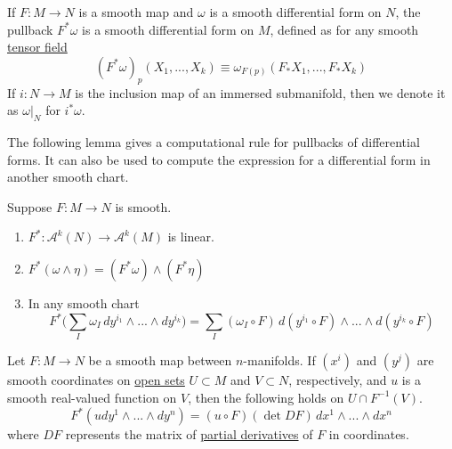\documentclass{article}
\newcounter{theorem}[section]
\begin{document}
    If $F: M \to N$ is a smooth map and $\omega$ is a smooth differential form on $N$, the pullback $F^* \omega$ is a smooth differential form on $M$, defined as for any smooth \hyperref[def:tensor-field]{tensor field} 
    \begin{equation}
      (F^* \omega)_p (X_1, ..., X_k) \equiv \omega_{F(p)} (F_* X_1, ..., F_* X_k)
    \end{equation}
    If $i: N \to M$ is the inclusion map of an immersed submanifold, then we denote it as $\omega \big|_N$ for $i^* \omega$. 

    The following lemma gives a computational rule for pullbacks of differential forms. It can also be used to compute the expression for a differential form in another smooth chart. 
    \begin{lemma}
      \label{thm:properties-of-the-pullback-on-forms}
    Suppose $F: M \to N$ is smooth. 
    \begin{enumerate}
        \item $F^*: \mathcal{A}^k (N) \to \mathcal{A}^k (M)$ is linear. 
        \item $F^* (\omega \wedge \eta) = (F^* \omega) \wedge (F^* \eta)$
        \item In any smooth chart 
        \begin{equation}
          F^* \Big( \sum_I \omega_I \, dy^{i_1} \wedge ... \wedge dy^{i_k} \Big) = \sum_I (\omega_I \circ F) \, d(y^{i_1} \circ F) \wedge ... \wedge d(y^{i_k} \circ F)
        \end{equation}
    \end{enumerate}
    \end{lemma}

    \begin{theorem}
      \label{thm:pullback-of-a-top-degree-form-in-coordinates}
    Let $F: M \to N$ be a smooth map between $n$-manifolds. If $(x^i)$ and $(y^j)$ are smooth coordinates on \hyperref[pst-def:open-set]{open sets} $U \subset M$ and $V \subset N$, respectively, and $u$ is a smooth real-valued function on $V$, then the following holds on $U \cap F^{-1} (V)$. 
    \begin{equation}
      F^* (u dy^1 \wedge ... \wedge dy^n) = (u \circ F) (\det{DF})\, dx^1 \wedge ... \wedge dx^n
    \end{equation}
    where $DF$ represents the matrix of \hyperref[mv-def:partial-derivative]{partial derivatives} of $F$ in coordinates. 
    \end{theorem}
\end{document}
